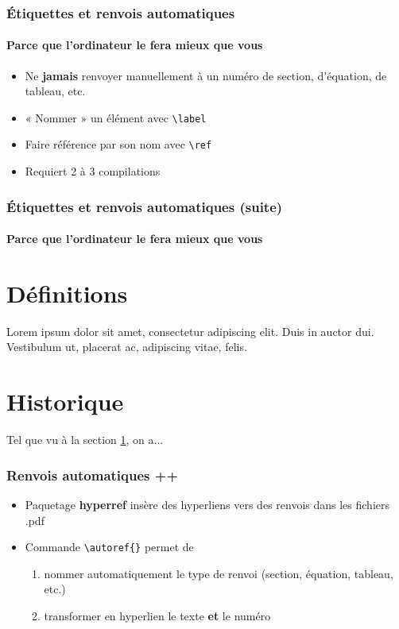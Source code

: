 \begin{frame}[c,fragile]
	
	\frametitle{Étiquettes et renvois automatiques}
	\framesubtitle{Parce que l'ordinateur le fera mieux que vous}
	
	\begin{itemize}
		\item Ne \textbf{jamais} renvoyer manuellement à un numéro de section,
		d’équation, de tableau, etc.
		\item « Nommer » un élément avec \lstinline|\label|
		\item Faire référence par son nom avec \lstinline|\ref|
		\item Requiert 2 à 3 compilations
	\end{itemize}
\end{frame}


\begin{frame}[c,fragile]

	\frametitle{Étiquettes et renvois automatiques (suite)}
	\framesubtitle{Parce que l'ordinateur le fera mieux que vous}
	
	\begin{codesource}
	\section{Définitions}
	\label{sec:definitions}
	Lorem ipsum dolor sit amet, consectetur
	adipiscing elit. Duis in auctor dui. Vestibulum
	ut, placerat ac, adipiscing vitae, felis.
	\section{Historique}
	Tel que vu à la section \ref{sec:definitions},
	on a...
	\end{codesource}
\end{frame}


\begin{frame}[c,fragile]

	\frametitle{Renvois automatiques ++}
	
	\begin{itemize}
		\item Paquetage \textbf{hyperref} insère des hyperliens vers des renvois dans les fichiers
		.pdf
		\item Commande \lstinline|\autoref{}| permet de
		
			\begin{enumerate}
				\item nommer automatiquement le type de renvoi (section, équation, tableau, etc.)
				\item transformer en hyperlien le texte \textbf{et} le numéro
			\end{enumerate}
	\end{itemize}
\end{frame}

